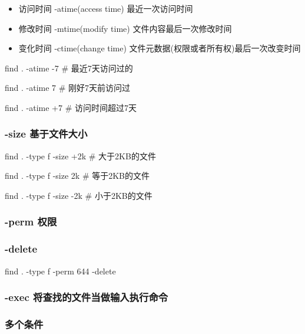 \begin{itemize}
\item 访问时间 -atime(access time) 最近一次访问时间
\item 修改时间 -mtime(modify time) 文件内容最后一次修改时间
\item 变化时间 -ctime(change time) 文件元数据(权限或者所有权)最后一次改变时间
\end{itemize}


\begin{Bash}

find . -atime -7  # 最近7天访问过的

find . -atime 7	  # 刚好7天前访问过

find . -atime +7  # 访问时间超过7天

\end{Bash}


\subsubsection{-size 基于文件大小}


\begin{Bash}

find . -type f -size +2k 		# 大于2KB的文件

find . -type f -size 2k			# 等于2KB的文件

find . -type f -size -2k		# 小于2KB的文件
\end{Bash}


\subsubsection{-perm 权限}

\subsubsection{-delete}

\begin{Bash}[删除匹配的文件]

find . -type f -perm 644 -delete


\end{Bash}

\subsubsection{-exec 将查找的文件当做输入执行命令}

\subsubsection{多个条件}

